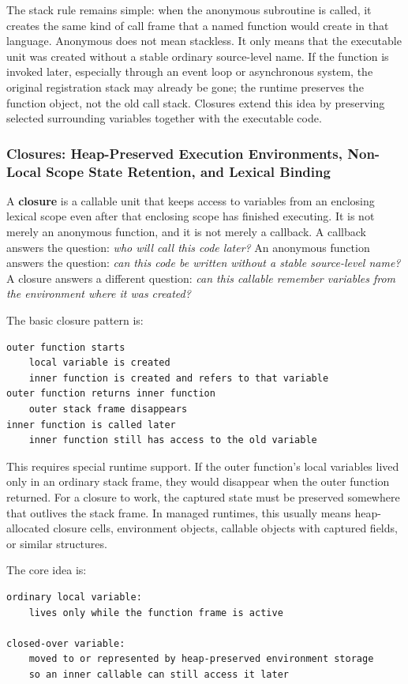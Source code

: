 The stack rule remains simple: when the anonymous subroutine is called, it creates the same kind of call frame that a named function would create in that language. Anonymous does not mean stackless. It only means that the executable unit was created without a stable ordinary source-level name. If the function is invoked later, especially through an event loop or asynchronous system, the original registration stack may already be gone; the runtime preserves the function object, not the old call stack. Closures extend this idea by preserving selected surrounding variables together with the executable code.


\subsubsection{Closures: Heap-Preserved Execution Environments, Non-Local Scope State Retention, and Lexical Binding}

A \textbf{closure} is a callable unit that keeps access to variables from an enclosing lexical scope even after that enclosing scope has finished executing. It is not merely an anonymous function, and it is not merely a callback. A callback answers the question: \emph{who will call this code later?} An anonymous function answers the question: \emph{can this code be written without a stable source-level name?} A closure answers a different question: \emph{can this callable remember variables from the environment where it was created?}

The basic closure pattern is:

\begin{verbatim}
outer function starts
    local variable is created
    inner function is created and refers to that variable
outer function returns inner function
    outer stack frame disappears
inner function is called later
    inner function still has access to the old variable
\end{verbatim}

This requires special runtime support. If the outer function's local variables lived only in an ordinary stack frame, they would disappear when the outer function returned. For a closure to work, the captured state must be preserved somewhere that outlives the stack frame. In managed runtimes, this usually means heap-allocated closure cells, environment objects, callable objects with captured fields, or similar structures.

The core idea is:

\begin{verbatim}
ordinary local variable:
    lives only while the function frame is active

closed-over variable:
    moved to or represented by heap-preserved environment storage
    so an inner callable can still access it later
\end{verbatim}

